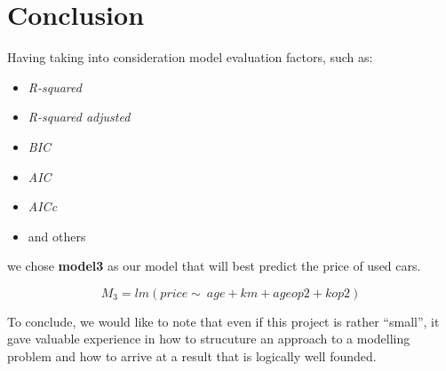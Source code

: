 \section{Conclusion} %
\label{sec:conclusion}

Having taking into consideration model evaluation factors, such as: 
\begin{itemize}
	\item \emph{R-squared}
	\item \emph{R-squared adjusted}
	\item \emph{BIC}
	\item \emph{AIC}
	\item \emph{AICc}
	\item and others
\end{itemize}

we chose \textbf{model3} as our model that will best predict the price of used cars.

\begin{equation}
	M_3 = lm(price \sim\ age + km + ageop2 + kop2)
\end{equation}

\hfill

To conclude, we would like to note that even if this project is rather 
``small'', it gave valuable experience in how to strucuture  an approach to a  
modelling problem and how to arrive at a result that is logically well 
founded. 

